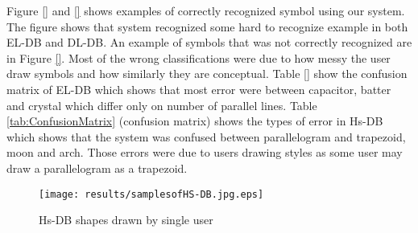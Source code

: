   Figure \ref{} and \ref{} shows examples of correctly recognized symbol using our system. The figure shows that system recognized some hard to recognize example in both EL-DB and DL-DB. An example of symbols that was not correctly recognized are in Figure \ref{}. Most of the wrong classifications were due to how messy the user draw symbols and how similarly they are conceptual. Table \ref{} show the confusion matrix of EL-DB which shows that most error were between capacitor, batter and crystal which differ only on number of parallel lines. Table \ref{tab:ConfusionMatrix} (confusion matrix) shows the types of error in Hs-DB which shows that the system was confused between parallelogram and trapezoid, moon and arch. Those errors were due to users drawing styles as some user may draw a parallelogram as a trapezoid. 

\begin{figure}
	\texttt{[image: results/samplesofHS-DB.jpg.eps]}
	\caption{Hs-DB shapes drawn by single user}
	\label{fig:samplesofHS-DB.jpg}
\end{figure}
 \begin{table*}
	\centering
	\caption{Confusion Matrix}
	\label{tab:ConfusionMatrix}
\end{table*}

